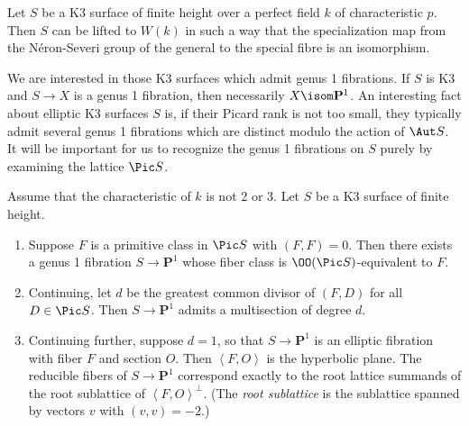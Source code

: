 \documentclass{article}
\newcommand{\adam}[1]{\textcolor{blue}{#1}}
\def\P{\mathbf{P}}
\newcommand{\class}[1]{\left< #1 \right>}
\begin{document}
\begin{prop} \label{PropLifting} Let $S$ be a K3 surface of finite height
  over a perfect field $k$ of characteristic $p$.  Then $S$ can be lifted
  to $W(k)$ in such a way that the specialization map from the N\'eron-Severi
  group of the general to the special fibre is an isomorphism.
\end{prop}

We are interested in those K3 surfaces which admit genus 1 fibrations. If $S$ is K3 and $S\to X$ is a genus 1 fibration, then necessarily $X\isom \P^1$.  An interesting fact about elliptic K3 surfaces $S$ is, if their Picard rank is not too small, they typically admit several genus 1 fibrations which are distinct modulo the action of $\Aut S$.  It will be important for us to recognize the genus 1 fibrations on $S$ purely by examining the lattice $\Pic S$.

\begin{prop}  \label{PropExistenceOfEllFib}
Assume that the characteristic of $k$ is not 2 or 3.  Let $S$ be a K3 surface of finite height.  
\begin{enumerate}
\item Suppose $F$ is a primitive class in $\Pic S$ with $(F,F)=0$.  Then there exists a genus 1 fibration $S\to\mathbf{P}^1$ whose fiber class is $\OO(\Pic S)$-equivalent to $F$.  
\item Continuing, let $d$ be the greatest common divisor of $(F,D)$ for all $D\in \Pic S$.   Then $S\to\mathbf{P}^1$ admits a multisection of degree $d$.  
\item Continuing further, suppose $d=1$, so that $S\to\mathbf{P}^1$ is an elliptic fibration with fiber $F$ and section $O$.  Then $\class{F,O}$ is the hyperbolic plane.   The reducible fibers of $S\to\mathbf{P}^1$ correspond exactly to the root lattice summands of the root sublattice of $\class{F,O}^{\perp}$.  (The {\em root sublattice} is the sublattice spanned by vectors $v$ with $(v,v)=-2$.)   
\end{enumerate}
\end{prop}
\end{document}
